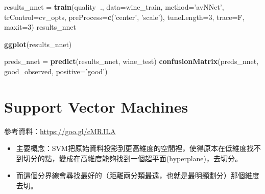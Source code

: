 \documentclass[]{book}
\newenvironment{Shaded}{\begin{snugshade}}{\end{snugshade}}
\newcommand{\KeywordTok}[1]{\textcolor[rgb]{0.13,0.29,0.53}{\textbf{#1}}}
\newcommand{\DataTypeTok}[1]{\textcolor[rgb]{0.13,0.29,0.53}{#1}}
\newcommand{\DecValTok}[1]{\textcolor[rgb]{0.00,0.00,0.81}{#1}}
\newcommand{\StringTok}[1]{\textcolor[rgb]{0.31,0.60,0.02}{#1}}
\newcommand{\OperatorTok}[1]{\textcolor[rgb]{0.81,0.36,0.00}{\textbf{#1}}}
\newcommand{\NormalTok}[1]{#1}
\providecommand{\tightlist}{%
  \setlength{\itemsep}{0pt}\setlength{\parskip}{0pt}}
\begin{document}
\begin{Shaded}
\begin{Highlighting}[]
\NormalTok{results_nnet =}\StringTok{ }\KeywordTok{train}\NormalTok{(quality}\OperatorTok{~}\NormalTok{., }
                     \DataTypeTok{data=}\NormalTok{wine_train, }
                     \DataTypeTok{method=}\StringTok{'avNNet'}\NormalTok{,}
                     \DataTypeTok{trControl=}\NormalTok{cv_opts, }
                     \DataTypeTok{preProcess=}\KeywordTok{c}\NormalTok{(}\StringTok{'center'}\NormalTok{, }\StringTok{'scale'}\NormalTok{),}
                     \DataTypeTok{tuneLength=}\DecValTok{3}\NormalTok{, }
                     \DataTypeTok{trace=}\NormalTok{F, }
                     \DataTypeTok{maxit=}\DecValTok{3}\NormalTok{)}
\NormalTok{results_nnet}
\end{Highlighting}
\end{Shaded}

\begin{Shaded}
\begin{Highlighting}[]
\KeywordTok{ggplot}\NormalTok{(results_nnet)}
\end{Highlighting}
\end{Shaded}

\begin{Shaded}
\begin{Highlighting}[]
\NormalTok{preds_nnet =}\StringTok{ }\KeywordTok{predict}\NormalTok{(results_nnet, wine_test)}
\KeywordTok{confusionMatrix}\NormalTok{(preds_nnet, good_observed, }\DataTypeTok{positive=}\StringTok{'good'}\NormalTok{)}
\end{Highlighting}
\end{Shaded}

\hypertarget{support-vector-machines}{%
\chapter{Support Vector Machines}\label{support-vector-machines}}

參考資料：\url{https://goo.gl/cMRJLA}

\begin{itemize}
\tightlist
\item
  主要概念：SVM把原始資料投影到更高維度的空間裡，使得原本在低維度找不到切分的點，變成在高維度能夠找到一個超平面(hyperplane)，去切分。
\end{itemize}

\begin{itemize}
\tightlist
\item
  而這個分界線會尋找最好的（距離兩分類最遠，也就是最明顯劃分）那個維度去切。
\end{itemize}
\end{document}
